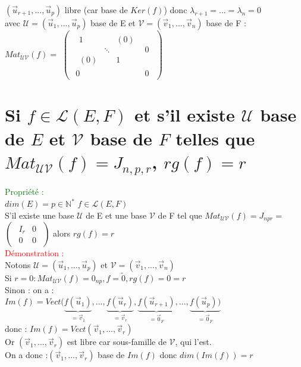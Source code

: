 \documentclass{article}
\begin{document}
				$(\vec u_{r+1},...,\vec u_p)$ libre (car base de $Ker(f)$) donc $\lambda_{r+1}=...= \lambda_n= 0$ \\
				avec $\mathcal U= (\vec u_1,..., \vec u_p)$ base de E et $\mathcal V=(\vec v_1,..., \vec v_n)$ base de F : \\
				$Mat_{\mathcal{UV}}(f)=$ $\begin{pmatrix}\begin{array}{c|c}\begin{matrix}
				1 &  & (0) \\  & \ddots & \\ (0) & & 1
				\end{matrix} & 0 \\ \hline0 & 0 \end{array}\end{pmatrix}$
        \section{Si $f \in \mathcal L(E,F)$ et s'il existe $\mathcal U$ base de $E$ et $\mathcal V$ base de $F$ telles que $Mat_{\mathcal{UV}}(f)=J_{n,p,r}$, $rg(f)=r$}
				\textcolor{green}{Propriété :} \\
				$dim(E)=p \in \mathbb N^*$ $f \in \mathcal L(E,F)$ \\
				S'il existe une base $\mathcal U$ de E et une base $\mathcal V$ de F tel que $Mat_{\mathcal{UV}}(f)=J_{npr}=$ $\begin{pmatrix}\begin{array}{c|c}I _r& 0 \\ \hline0 & 0 \end{array}\end{pmatrix}$ alors $rg(f)=r$ \\
				\textcolor{red}{Démonstration :} \\
				Notons $\mathcal U= (\vec u_1,...,\vec u_p)$ et $\mathcal V=(\vec v_1,...,\vec v_n)$ \\
				Si $r=0:Mat_{\mathcal{UV}}(f)=0_{np},f=\tilde{0},rg(f)=0=r$ \\
				Sinon : on a : \\
				$Im(f)=Vect(\underbrace{f(\vec u_1)}_{=\vec v_1},...,\underbrace{f(\vec u_r)}_{=\vec v_r},\underbrace{f(\vec u_{r+1})}_{=\vec 0_F},...,\underbrace{f(\vec u_p))}_{=\vec 0_F}$ \\
				donc : $Im(f)=Vect(\vec v_1,..., \vec v_r)$ \\
				Or $(\vec v_1,...,\vec v_r)$ est libre car sous-famille de $\mathcal V$, qui l'est. \\
				On a donc :$(\vec v_1,...,\vec v_r)$ base de $Im(f)$ donc $dim(Im(f))=r$
\end{document}
